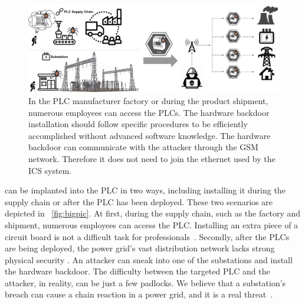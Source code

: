 \begin{figure}[tp!]
	\includegraphics[width=\textwidth]{figures/bigpic}
	\centering
	\caption{In the PLC manufacturer factory or during the product shipment, numerous employees can access the PLCs. The hardware backdoor installation should follow specific procedures to be efficiently accomplished without advanced software knowledge. The hardware backdoor can communicate with the attacker through the GSM network. Therefore it does not need to join the ethernet used by the ICS system.}
	\label{fig:bigpic}
\end{figure}

\name can be implanted into the PLC in two ways, including installing it during the supply chain or after the PLC has been deployed. These two scenarios are depicted in ~\autoref{fig:bigpic}. At first, during the supply chain, such as the factory and shipment, numerous employees can access the PLC. Installing an extra piece of a circuit board is not a difficult task for professionals~\cite{harrison2021malicious, o2015special}. Secondly, after the PLCs are being deployed, the power grid's vast distribution network lacks strong physical security \cite{Loopholes2020}. An attacker can sneak into one of the substations and install the hardware backdoor. The difficulty between the targeted PLC and the attacker, in reality, can be just a few padlocks. We believe that a substation's breach can cause a chain reaction in a power grid, and it is a real threat~\cite{substationattack, chen2020study}.



